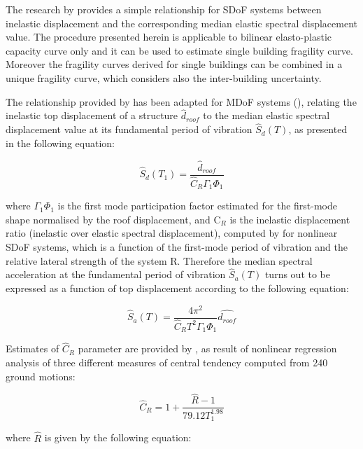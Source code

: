 The research by \citep{RuizGarciaMiranda2007} provides a simple relationship for SDoF systems between inelastic displacement  and the corresponding median elastic spectral displacement value. The procedure presented herein is applicable to bilinear elasto-plastic capacity curve only and it can be used to estimate single building fragility curve. Moreover the fragility curves derived for single buildings can be combined in a unique fragility curve, which considers also the inter-building uncertainty.

The relationship provided by \citep{RuizGarciaMiranda2007} has been adapted for MDoF systems (\citep{Vamvatsikos2014}), relating the inelastic top displacement of a structure $\hat{d}_{roof}$ to the median elastic spectral displacement value at its fundamental period of vibration $\hat{S}_{d}(T)$, as presented in the following equation:

\begin{equation}
\hat{S}_d(T_1) = \frac{\hat{d}_{roof}}{\hat{C}_R \Gamma_1 \Phi_1} 
\label{eq:basic_DF}
\end{equation}

where $\Gamma_1 \Phi_1$ is the first mode participation factor estimated for the first-mode shape normalised by the roof displacement, and C$_R$ is the inelastic displacement ratio (inelastic over elastic spectral displacement), computed by \citep{RuizGarciaMiranda2007} for nonlinear SDoF systems, which is a function of the first-mode period of vibration and the relative lateral strength of the system R. Therefore the median spectral acceleration at the fundamental period of vibration $\hat{S}_{a}(T)$ turns out to be expressed as a function of top displacement according to the following equation:

\begin{equation}
\hat{S}_{a}(T) = \frac{4 \pi^2}{\hat{C}_R T^2 \Gamma_1 \Phi_1} \hat{d_{roof}}
\label{eq:Sa_RGM}
\end{equation}

Estimates of $\hat{C}_R$ parameter are provided by \citep{RuizGarciaMiranda2007}, as result of nonlinear regression analysis of three different measures of central tendency computed from 240 ground motions:

\begin{equation}
\hat{C}_R = 1 + \frac{\hat{R} - 1}{79.12 T_1 ^{1.98}}
\label{eq:Cr_RGM}
\end{equation}

where $\hat{R}$ is given by the following equation:

